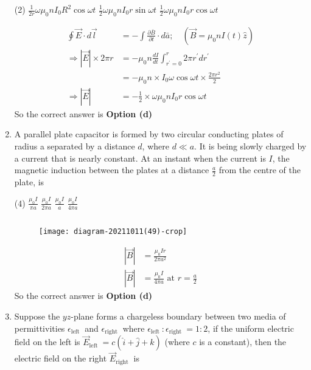 \begin{enumerate}
	\begin{tasks}(2)
		\task[\textbf{b.}]$\frac{1}{2 r} \omega \mu_{0} n I_{0} R^{2} \cos \omega t$
		\task[\textbf{c.}]$\frac{1}{2} \omega \mu_{0} n I_{0} r \sin \omega t$
		\task[\textbf{d.}]  $\frac{1}{2} \omega \mu_{0} n I_{0} r \cos \omega t$
	\end{tasks}
\begin{answer}
	\begin{align*}
	\oint \vec{E} \cdot d \vec{l}&=-\int \frac{\partial \bar{B}}{\partial t} \cdot d \bar{a} ; \quad\left(\vec{B}=\mu_{0} n I(t) \hat{z}\right)\\
	\Rightarrow|\vec{E}| \times 2 \pi r&=-\mu_{0} n \frac{d I}{d t} \int_{r^{\prime}=0}^{r} 2 \pi r^{\prime} d r^{\prime}\\&=-\mu_{0} n \times I_{0} \omega \cos \omega t \times \frac{2 \pi r^{2}}{2}\\
	\Rightarrow|\vec{E}|&=-\frac{1}{2} \times \omega \mu_{0} n I_{0} r \cos \omega t
	\end{align*}
	So the correct answer is \textbf{Option (d)}
\end{answer}	
	\item A parallel plate capacitor is formed by two circular conducting plates of radius a separated by a distance $d$, where $d \ll a$. It is being slowly charged by a current that is nearly constant. At an instant when the current is $I$, the magnetic induction between the plates at a distance $\frac{a}{2}$ from the centre of the plate, is
	{}	
	\begin{tasks}(4)
		\task[\textbf{a.}]$\frac{\mu_{0} I}{\pi a}$
		\task[\textbf{b.}]$\frac{\mu_{0} I}{2 \pi a}$
		\task[\textbf{c.}]$\frac{\mu_{0} I}{a}$
		\task[\textbf{d.}]  $\frac{\mu_{0} I}{4 \pi a}$
	\end{tasks}	
\begin{answer}$\left. \right. $
	\begin{figure}[H]
		\centering
		\texttt{[image: diagram-20211011(49)-crop]}
	\end{figure}
	\begin{align*}
	|\vec{B}|&=\frac{\mu_{0} I r}{2 \pi a^{2}}\\
	|\vec{B}|&=\frac{\mu_{0} I}{4 \pi a}\text{ at }r=\frac{a}{2}
	\end{align*}
	So the correct answer is \textbf{Option (d)}
\end{answer}
	\item Suppose the $y z$-plane forms a chargeless boundary between two media of permittivities $\epsilon_{\text {left }}$ and $\epsilon_{\text {right }}$ where $\epsilon_{\text {left }}: \epsilon_{\text {right }}=1: 2$, if the uniform electric field on the left is $\vec{E}_{\text {left }}=c(\hat{i}+\hat{j}+\hat{k})$ (where $c$ is a constant), then the electric field on the right $\vec{E}_{\text {right }}$ is

\end{enumerate}
